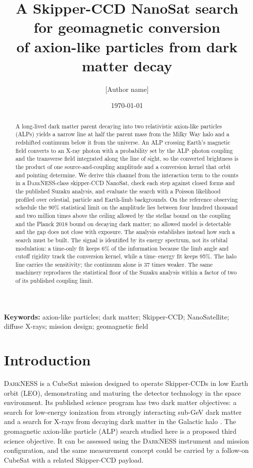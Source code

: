 \documentclass[11pt]{article}
\title{A Skipper-CCD NanoSat search for geomagnetic conversion\\ of axion-like particles from dark matter decay}
\author{[Author name]}
\date{\today}
\newcommand{\DarkNESS}{\textsc{DarkNESS}}
\begin{document}
\maketitle

\begin{abstract}
A long-lived dark matter parent decaying into two relativistic axion-like particles (ALPs) yields a narrow line at half the parent mass from the Milky Way halo and a redshifted continuum below it from the universe. An ALP crossing Earth's magnetic field converts to an X-ray photon with a probability set by the ALP--photon coupling and the transverse field integrated along the line of sight, so the converted brightness is the product of one source-and-coupling amplitude and a conversion kernel that orbit and pointing determine. We derive this channel from the interaction term to the counts in a \DarkNESS{}-class skipper-CCD NanoSat, check each step against closed forms and the published Suzaku analysis, and evaluate the search with a Poisson likelihood profiled over celestial, particle and Earth-limb backgrounds. On the reference observing schedule the 90\% statistical limit on the amplitude lies between four hundred thousand and two million times above the ceiling allowed by the stellar bound on the coupling and the Planck 2018 bound on decaying dark matter; no allowed model is detectable and the gap does not close with exposure. The analysis establishes instead how such a search must be built. The signal is identified by its energy spectrum, not its orbital modulation: a time-only fit keeps 6\% of the information because the limb angle and cutoff rigidity track the conversion kernel, while a time--energy fit keeps 95\%. The halo line carries the sensitivity; the continuum alone is 37 times weaker. The same machinery reproduces the statistical floor of the Suzaku analysis within a factor of two of its published coupling limit.
\end{abstract}

\noindent\textbf{Keywords:} axion-like particles; dark matter; Skipper-CCD; NanoSatellite; diffuse X-rays; mission design; geomagnetic field

\section{Introduction}
\label{sec:introduction}

\DarkNESS{} is a CubeSat mission designed to operate Skipper-CCDs in low Earth orbit (LEO), demonstrating and maturing the detector technology in the space environment. Its published science program has two dark matter objectives: a search for low-energy ionization from strongly interacting sub-GeV dark matter and a search for X-rays from decaying dark matter in the Galactic halo \citep{alpine2025darkness}. The geomagnetic axion-like particle (ALP) search studied here is a proposed third science objective. It can be assessed using the \DarkNESS{} instrument and mission configuration, and the same measurement concept could be carried by a follow-on CubeSat with a related Skipper-CCD payload.
\end{document}
